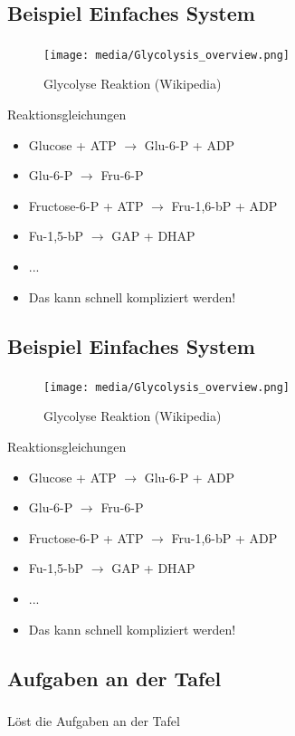 \subsection{Beispiel Einfaches System}
\begin{frame}
    \frametitle{\insertsubsection}
    \begin{minipage}{0.4\textwidth}
        \begin{figure}
            \centering
            \texttt{[image: media/Glycolysis\_overview.png]}
            \caption{Glycolyse Reaktion (Wikipedia)}
        \end{figure}
    \end{minipage}%
    \begin{minipage}{0.6\textwidth}
        Reaktionsgleichungen
        \begin{itemize}[<+->]
            \item Glucose + ATP $\rightarrow$ Glu-6-P + ADP
            \item Glu-6-P $\rightarrow$ Fru-6-P
            \item Fructose-6-P + ATP $\rightarrow$ Fru-1,6-bP + ADP
            \item Fu-1,5-bP $\rightarrow$ GAP + DHAP
            \item ...
            \item Das kann schnell kompliziert werden!
        \end{itemize}
    \end{minipage}
\end{frame}


\subsection{Beispiel Einfaches System}
\begin{frame}
    \frametitle{\insertsubsection}
    \begin{minipage}{0.4\textwidth}
        \begin{figure}
            \centering
            \texttt{[image: media/Glycolysis\_overview.png]}
            \caption{Glycolyse Reaktion (Wikipedia)}
        \end{figure}
    \end{minipage}%
    \begin{minipage}{0.6\textwidth}
        Reaktionsgleichungen
        \begin{itemize}[<+->]
            \item Glucose + ATP $\rightarrow$ Glu-6-P + ADP
            \item Glu-6-P $\rightarrow$ Fru-6-P
            \item Fructose-6-P + ATP $\rightarrow$ Fru-1,6-bP + ADP
            \item Fu-1,5-bP $\rightarrow$ GAP + DHAP
            \item ...
            \item Das kann schnell kompliziert werden!
        \end{itemize}
    \end{minipage}
\end{frame}


\subsection{Aufgaben an der Tafel}
\begin{frame}
    \frametitle{\insertsubsection}
    Löst die Aufgaben an der Tafel
\end{frame}